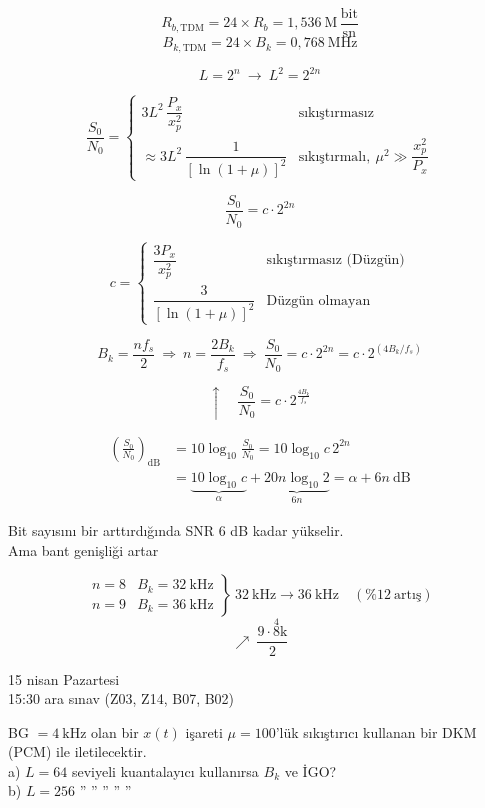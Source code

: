 \documentclass[11pt,a4paper]{article}
\begin{document}
\[ R_{b,\mathrm{TDM}}=24\times R_b=1{,}536\ \mathrm{M}\,\frac{\mathrm{bit}}{\mathrm{sn}} \]
\[ B_{k,\mathrm{TDM}}=24\times B_k=0{,}768\ \mathrm{MHz} \]

\[ L=2^n\ \longrightarrow\ L^2=2^{2n} \]

\[ \frac{S_0}{N_0}=\begin{cases} 3L^2\,\dfrac{P_x}{x_p^2} & \text{sıkıştırmasız}\\[3mm] \approx 3L^2\,\dfrac{1}{\left[\ln(1+\mu)\right]^2} & \text{sıkıştırmalı},\ \mu^2\gg\dfrac{x_p^2}{P_x} \end{cases} \]

\[ \frac{S_0}{N_0}=c\cdot 2^{2n} \]

\[ c=\begin{cases} \dfrac{3P_x}{x_p^2} & \text{sıkıştırmasız (Düzgün)}\\[3mm] \dfrac{3}{\left[\ln(1+\mu)\right]^2} & \text{Düzgün olmayan} \end{cases} \]

\[ B_k=\frac{n f_s}{2}\ \Longrightarrow\ n=\frac{2B_k}{f_s}\ \Longrightarrow\ \frac{S_0}{N_0}=c\cdot 2^{2n}=c\cdot 2^{\left(4B_k/f_s\right)} \]

\[ \uparrow\quad \frac{S_0}{N_0}=c\cdot 2^{\frac{4B_k}{f_s}} \]


\begin{align*}
\left(\frac{S_0}{N_0}\right)_{\mathrm{dB}} &= 10\log_{10}\frac{S_0}{N_0} = 10\log_{10}c\,2^{2n}\\
&= \underbrace{10\log_{10}c}_{\alpha}+\underbrace{20n\log_{10}2}_{6n} = \alpha+6n\ \mathrm{dB}
\end{align*}

Bit sayısını bir arttırdığında SNR 6 dB kadar yükselir.\\
Ama bant genişliği artar

\[ \left.\begin{array}{ll} n=8 & B_k=32\ \mathrm{kHz}\\ n=9 & B_k=36\ \mathrm{kHz}\end{array}\right\}\ 32\ \mathrm{kHz}\longrightarrow 36\ \mathrm{kHz}\quad(\%12\ \text{artış}) \]
\[ \nearrow\ \frac{9\cdot\overset{4}{8}\mathrm{k}}{2} \]

15 nisan Pazartesi\\
15:30 ara sınav (Z03, Z14, B07, B02)

\begin{ornek}
BG $=4\ \mathrm{kHz}$ olan bir $x(t)$ işareti $\mu=100$'lük sıkıştırıcı kullanan bir DKM (PCM) ile iletilecektir.\\
a) $L=64$ seviyeli kuantalayıcı kullanırsa $B_k$ ve İGO?\\
b) $L=256$ \quad '' \quad '' \quad '' \quad '' \quad ''
\end{ornek}
\end{document}
